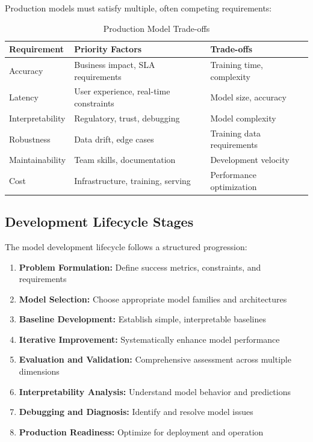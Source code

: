 Production models must satisfy multiple, often competing requirements:

\begin{table}[h]
\centering
\caption{Production Model Trade-offs}
\label{tab:model_tradeoffs}
\begin{tabular}{|l|l|l|}
\hline
\textbf{Requirement} & \textbf{Priority Factors} & \textbf{Trade-offs} \\
\hline
Accuracy & Business impact, SLA requirements & Training time, complexity \\
Latency & User experience, real-time constraints & Model size, accuracy \\
Interpretability & Regulatory, trust, debugging & Model complexity \\
Robustness & Data drift, edge cases & Training data requirements \\
Maintainability & Team skills, documentation & Development velocity \\
Cost & Infrastructure, training, serving & Performance optimization \\
\hline
\end{tabular}
\end{table}

\subsection{Development Lifecycle Stages}

The model development lifecycle follows a structured progression:

\begin{enumerate}
    \item \textbf{Problem Formulation:} Define success metrics, constraints, and requirements
    \item \textbf{Model Selection:} Choose appropriate model families and architectures
    \item \textbf{Baseline Development:} Establish simple, interpretable baselines
    \item \textbf{Iterative Improvement:} Systematically enhance model performance
    \item \textbf{Evaluation and Validation:} Comprehensive assessment across multiple dimensions
    \item \textbf{Interpretability Analysis:} Understand model behavior and predictions
    \item \textbf{Debugging and Diagnosis:} Identify and resolve model issues
    \item \textbf{Production Readiness:} Optimize for deployment and operation
\end{enumerate}

